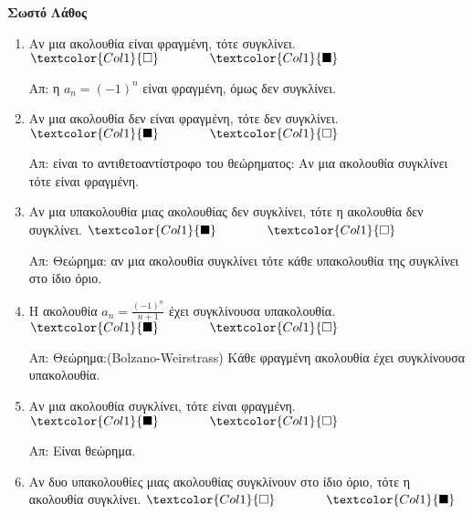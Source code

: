 \documentclass[a4paper,table]{report}
\begin{document}
\begin{center}
  \minibox{\large\bfseries \textcolor{Col2}{Ακολουθίες (Ερωτήσεις)}}
\end{center}


\vspace{\baselineskip}

\hfill \textcolor{Col1}{\textbf{Σωστό}} \quad \textcolor{Col1}{\textbf{Λάθος}}
\begin{enumerate}[itemsep=.5\baselineskip]
  \item \textcolor{Col1}{Αν μια ακολουθία είναι φραγμένη, τότε συγκλίνει}. 
    \hfill $\textcolor{Col1}{\square} \qquad \qquad \textcolor{Col1}{\blacksquare}$

    Απ: η $ a_{n}=(-1)^{n} $ είναι φραγμένη, όμως δεν συγκλίνει. 

  \item \textcolor{Col1}{Αν μια ακολουθία δεν είναι φραγμένη, τότε δεν συγκλίνει}.
    \hfill $\textcolor{Col1}{\blacksquare} \qquad \qquad \textcolor{Col1}{\square}$

    Απ: είναι το αντιθετοαντίστροφο του θεώρηματος: Αν μια ακολουθία συγκλίνει τότε 
    είναι φραγμένη. 

  \item \textcolor{Col1}{Αν μια υπακολουθία μιας ακολουθίας δεν συγκλίνει, τότε η
    ακολουθία δεν συγκλίνει}.
    \hfill $\textcolor{Col1}{\blacksquare} \qquad \qquad \textcolor{Col1}{\square}$

    Απ: Θεώρημα: αν μια ακολουθία συγκλίνει τότε κάθε υπακολουθία της συγκλίνει 
    στο ίδιο όριο. 

  \item \textcolor{Col1}{Η ακολουθία $ a_{n}= \frac{(-1)^{n}}{n+1} $ έχει συγκλίνουσα
    υπακολουθία}.
    \hfill $\textcolor{Col1}{\blacksquare} \qquad \qquad \textcolor{Col1}{\square}$

    Απ: Θεώρημα:(Bolzano-Weirstrass) Κάθε φραγμένη ακολουθία έχει συγκλίνουσα 
    υπακολουθία. 

  \item \textcolor{Col1}{Αν μια ακολουθία συγκλίνει, τότε είναι φραγμένη}.
    \hfill $\textcolor{Col1}{\blacksquare} \qquad \qquad \textcolor{Col1}{\square}$

    Απ: Είναι θεώρημα. 

  \item \textcolor{Col1}{Αν δυο υπακολουθίες μιας ακολουθίας συγκλίνουν στο ίδιο όριο,
    τότε η ακολουθία συγκλίνει}.
    \hfill $\textcolor{Col1}{\square} \qquad \qquad \textcolor{Col1}{\blacksquare}$


\end{enumerate}
\end{document}

